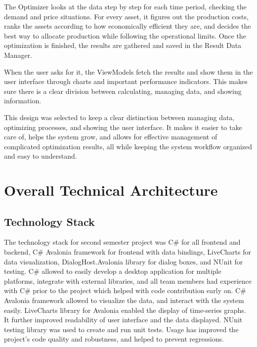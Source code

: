 The Optimizer looks at the data step by step for each time period, checking the demand and price situations. For every asset, it figures out the production costs, ranks the assets according to how economically efficient they are, and decides the best way to allocate production while following the operational limits. Once the optimization is finished, the results are gathered and saved in the Result Data Manager.\par

When the user asks for it, the ViewModels fetch the results and show them in the user interface through charts and important performance indicators. This makes sure there is a clear division between calculating, managing data, and showing information.\par

This design was selected to keep a clear distinction between managing data, optimizing processes, and showing the user interface. It makes it easier to take care of, helps the system grow, and allows for effective management of complicated optimization results, all while keeping the system workflow organized and easy to understand.\par


\section{Overall Technical Architecture}
\subsection*{Technology Stack}

The technology stack for second semester project was C\# for all frontend and backend, C\# Avalonia framework \cite{avalonia} for frontend with data bindings, LiveCharts \cite{livecharts} for data visualization, DialogHost.Avalonia library \cite{dialoghost} for dialog boxes, and NUnit \cite{nunit} for testing. C\# allowed to easily develop a desktop application for multiple platforms, integrate with external libraries, and all team members had experience with C\# prior to the project which helped with code contribution early on. C\# Avalonia framework allowed to visualize the data, and interact with the system easily. LiveCharts library for Avalonia enabled the display of time-series graphs. It further improved readability of user interface and the data displayed. NUnit testing library was used to create and run unit tests. Usage has improved the project's code quality and robustness, and helped to prevent regressions.

